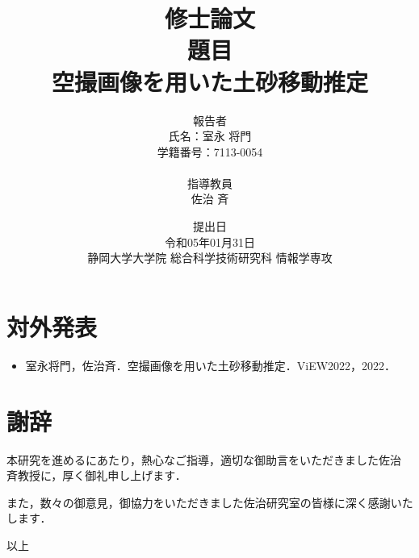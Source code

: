 


  \title{
    修士論文 \\
    \vspace{30pt}
    題目 \\
    空撮画像を用いた土砂移動推定 \\
    \vspace{60pt}
  }
  \author{
    報告者 \\
    氏名：室永 将門 \\
    学籍番号：7113-0054 \\
    \\
    指導教員 \\
    佐治 斉
    \vspace{30pt}
  }
  \date{
    提出日 \\
    令和05年01月31日 \\
    静岡大学大学院 総合科学技術研究科 情報学専攻 \\
  }
  \maketitle

  \setcounter{tocdepth}{3}
  \tableofcontents

  
  
  
  

  \chapter*{対外発表}

    \begin{itemize}
      \item 室永将門，佐治斉．空撮画像を用いた土砂移動推定．ViEW2022，2022．
    \end{itemize}

  \clearpage

  \renewcommand{\bibname}{参考文献}
    
    

  \chapter*{謝辞}
      本研究を進めるにあたり，熱心なご指導，適切な御助言をいただきました佐治 斉教授に，厚く御礼申し上げます．

      また，数々の御意見，御協力をいただきました佐治研究室の皆様に深く感謝いたします．

    \begin{flushright}
      以上
    \end{flushright}


